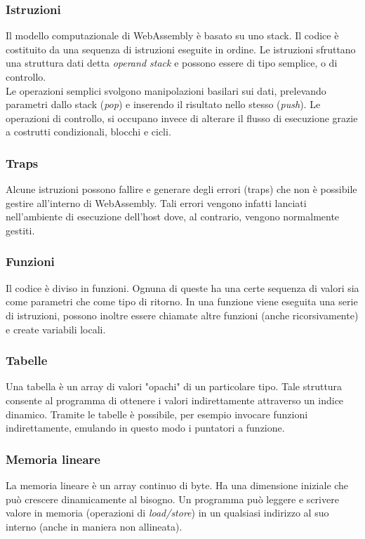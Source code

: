 \subsubsection{Istruzioni}
Il modello computazionale di WebAssembly è basato su uno stack. Il codice è costituito da una sequenza di istruzioni eseguite in ordine. Le istruzioni sfruttano una struttura dati detta \emph{operand stack} e possono essere di tipo semplice, o di controllo.
\\Le operazioni semplici svolgono manipolazioni basilari sui dati, prelevando parametri dallo stack (\emph{pop}) e inserendo il risultato nello stesso (\emph{push}). Le operazioni di controllo, si occupano invece di alterare il flusso di esecuzione grazie a costrutti condizionali, blocchi e cicli.
\subsubsection{Traps} 
Alcune istruzioni possono fallire e generare degli errori (traps) che non è possibile gestire all'interno di WebAssembly. Tali errori vengono infatti lanciati nell'ambiente di esecuzione dell'host dove, al contrario, vengono normalmente gestiti.
\subsubsection{Funzioni}
Il codice è diviso in funzioni. Ognuna di queste ha una certe sequenza di valori sia come parametri che come tipo di ritorno. In una funzione viene eseguita una serie di istruzioni, possono inoltre essere chiamate altre funzioni (anche ricorsivamente) e create variabili locali.
\subsubsection{Tabelle}
Una tabella è un array di valori "opachi" di un particolare tipo. Tale struttura consente al programma di ottenere i valori indirettamente attraverso un indice dinamico. Tramite le tabelle è possibile, per esempio invocare funzioni indirettamente, emulando in questo modo i puntatori a funzione.
\subsubsection{Memoria lineare}
La memoria lineare è un  array continuo di byte. Ha una dimensione iniziale che può crescere dinamicamente al bisogno. Un programma può leggere e scrivere valore in memoria (operazioni di \emph{load/store}) in un qualsiasi indirizzo al suo interno (anche in maniera non allineata).
